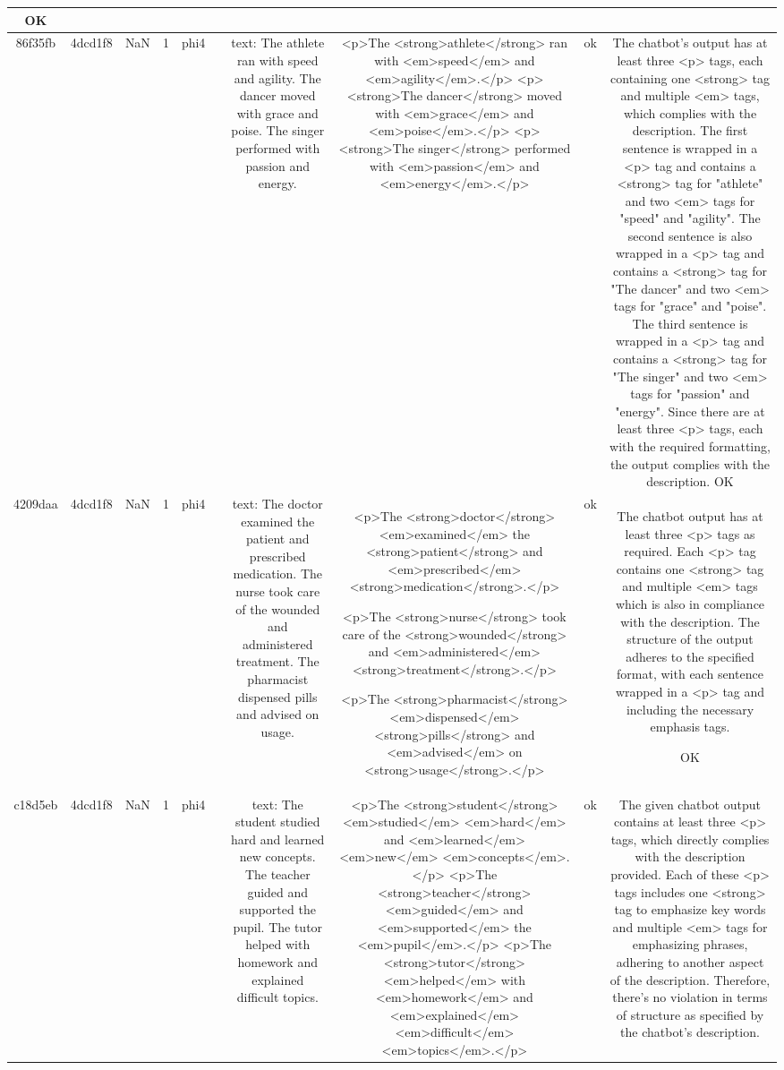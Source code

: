 \begin{table}[h!]
\begin{tabular}{|c|c|c|c|c|c|c|c|c|c|}
OK\\
\hline
86f35fb & 4dcd1f8 & NaN & 1 & phi4 &  & text: The athlete ran with speed and agility. The dancer moved with grace and poise. The singer performed with passion and energy. & <p>The <strong>athlete</strong> ran with <em>speed</em> and <em>agility</em>.</p>
<p><strong>The dancer</strong> moved with <em>grace</em> and <em>poise</em>.</p>
<p><strong>The singer</strong> performed with <em>passion</em> and <em>energy</em>.</p> & ok & The chatbot's output has at least three <p> tags, each containing one <strong> tag and multiple <em> tags, which complies with the description. The first sentence is wrapped in a <p> tag and contains a <strong> tag for "athlete" and two <em> tags for "speed" and "agility". The second sentence is also wrapped in a <p> tag and contains a <strong> tag for "The dancer" and two <em> tags for "grace" and "poise". The third sentence is wrapped in a <p> tag and contains a <strong> tag for "The singer" and two <em> tags for "passion" and "energy". Since there are at least three <p> tags, each with the required formatting, the output complies with the description. 
OK\\
\hline
4209daa & 4dcd1f8 & NaN & 1 & phi4 &  & text: The doctor examined the patient and prescribed medication. The nurse took care of the wounded and administered treatment. The pharmacist dispensed pills and advised on usage. & <p>The <strong>doctor</strong> <em>examined</em> the <strong>patient</strong> and <em>prescribed</em> <strong>medication</strong>.</p>

<p>The <strong>nurse</strong> took care of the <strong>wounded</strong> and <em>administered</em> <strong>treatment</strong>.</p>

<p>The <strong>pharmacist</strong> <em>dispensed</em> <strong>pills</strong> and <em>advised</em> on <strong>usage</strong>.</p> & ok & The chatbot output has at least three <p> tags as required. Each <p> tag contains one <strong> tag and multiple <em> tags which is also in compliance with the description. The structure of the output adheres to the specified format, with each sentence wrapped in a <p> tag and including the necessary emphasis tags.

OK\\
\hline
c18d5eb & 4dcd1f8 & NaN & 1 & phi4 &  & text: The student studied hard and learned new concepts. The teacher guided and supported the pupil. The tutor helped with homework and explained difficult topics. & <p>The <strong>student</strong> <em>studied</em> <em>hard</em> and <em>learned</em> <em>new</em> <em>concepts</em>.</p>
<p>The <strong>teacher</strong> <em>guided</em> and <em>supported</em> the <em>pupil</em>.</p>
<p>The <strong>tutor</strong> <em>helped</em> with <em>homework</em> and <em>explained</em> <em>difficult</em> <em>topics</em>.</p> & ok & The given chatbot output contains at least three <p> tags, which directly complies with the description provided. Each of these <p> tags includes one <strong> tag to emphasize key words and multiple <em> tags for emphasizing phrases, adhering to another aspect of the description. Therefore, there's no violation in terms of structure as specified by the chatbot's description.


\end{tabular}
\end{table}
